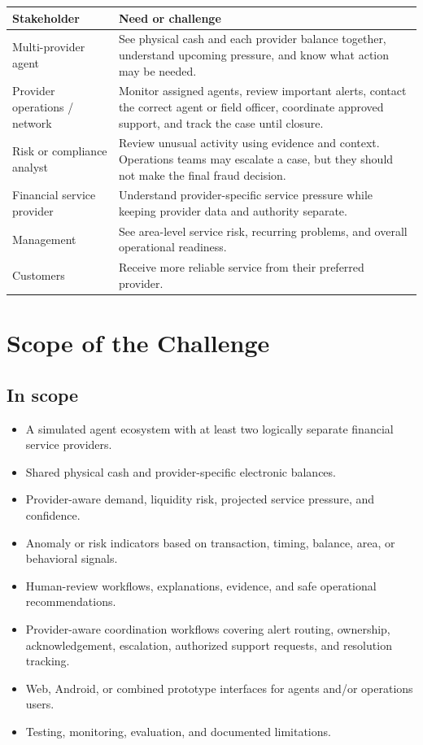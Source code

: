 \documentclass[11pt,a4paper]{article}
\begin{document}
\vspace{1em}
\noindent
\begin{tabularx}{\textwidth}{@{} l X @{}}
\toprule
\textbf{Stakeholder} & \textbf{Need or challenge} \\
\midrule
Multi-provider agent & See physical cash and each provider balance together, understand upcoming pressure, and know what action may be needed. \\
\addlinespace
Provider operations / network & Monitor assigned agents, review important alerts, contact the correct agent or field officer, coordinate approved support, and track the case until closure. \\
\addlinespace
Risk or compliance analyst & Review unusual activity using evidence and context. Operations teams may escalate a case, but they should not make the final fraud decision. \\
\addlinespace
Financial service provider & Understand provider-specific service pressure while keeping provider data and authority separate. \\
\addlinespace
Management & See area-level service risk, recurring problems, and overall operational readiness. \\
\addlinespace
Customers & Receive more reliable service from their preferred provider. \\
\bottomrule
\end{tabularx}

\section{Scope of the Challenge}
\subsection*{In scope}
\begin{itemize}[noitemsep]
    \item A simulated agent ecosystem with at least two logically separate financial service providers.
    \item Shared physical cash and provider-specific electronic balances.
    \item Provider-aware demand, liquidity risk, projected service pressure, and confidence.
    \item Anomaly or risk indicators based on transaction, timing, balance, area, or behavioral signals.
    \item Human-review workflows, explanations, evidence, and safe operational recommendations.
    \item Provider-aware coordination workflows covering alert routing, ownership, acknowledgement, escalation, authorized support requests, and resolution tracking.
    \item Web, Android, or combined prototype interfaces for agents and/or operations users.
    \item Testing, monitoring, evaluation, and documented limitations.
\end{itemize}
\end{document}
